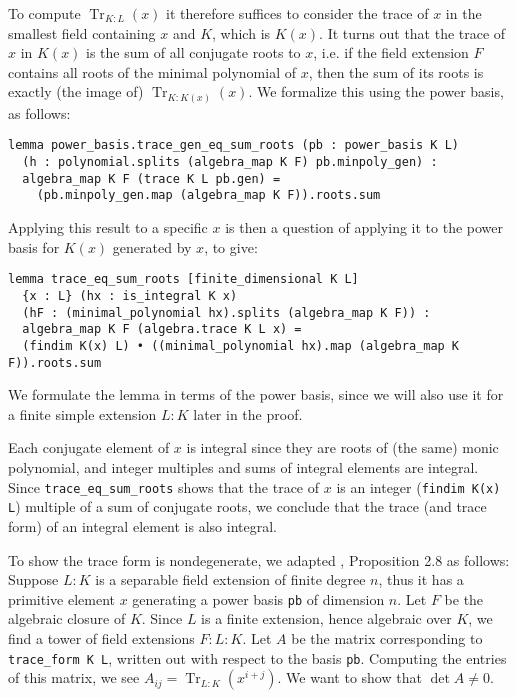 \documentclass{lipics-v2021}
\newcommand{\lean}[1]{\texttt{#1}\xspace} %
\DeclareMathOperator{\Tr}{\mathrm{Tr}}
\begin{document}
To compute $\Tr_{K : L}(x)$ it therefore suffices to consider the trace of $x$ in the smallest field containing $x$ and $K$, which is $K(x)$.
It turns out that the trace of $x$ in $K(x)$ is the sum of all conjugate roots to $x$,
i.e. if the field extension $F$ contains all roots of the minimal polynomial of $x$, then the sum of its roots is exactly (the image of) $\Tr_{K : K(x)}(x)$.
We formalize this using the power basis, as follows:
\begin{lstlisting}
lemma power_basis.trace_gen_eq_sum_roots (pb : power_basis K L)
  (h : polynomial.splits (algebra_map K F) pb.minpoly_gen) :
  algebra_map K F (trace K L pb.gen) =
    (pb.minpoly_gen.map (algebra_map K F)).roots.sum
\end{lstlisting}
Applying this result to a specific $x$ is then a question of applying it to the power basis for $K(x)$ generated by $x$, to give:
\begin{lstlisting}
lemma trace_eq_sum_roots [finite_dimensional K L]
  {x : L} (hx : is_integral K x)
  (hF : (minimal_polynomial hx).splits (algebra_map K F)) :
  algebra_map K F (algebra.trace K L x) =
  (findim K(x) L) • ((minimal_polynomial hx).map (algebra_map K F)).roots.sum
\end{lstlisting}
We formulate the lemma in terms of the power basis, since we will also use it for a finite simple extension $L : K$ later in the proof.

Each conjugate element of $x$ is integral since they are roots of (the same) monic polynomial,
and integer multiples and sums of integral elements are integral.
Since \lean{trace\_eq\_sum\_roots} shows that the trace of $x$ is an integer (\lean{findim K(x) L}) multiple of a sum of conjugate roots,
we conclude that the trace (and trace form) of an integral element is also integral.

To show the trace form is nondegenerate, we adapted \cite{Neukirch}, Proposition 2.8 as follows:
Suppose $L : K$ is a separable field extension of finite degree $n$,
thus it has a primitive element $x$ generating a power basis \lean{pb} of dimension $n$.
Let $F$ be the algebraic closure of $K$. Since $L$ is a finite extension, hence algebraic over $K$, we find a tower of field extensions $F : L : K$.
Let $A$ be the matrix corresponding to \lean{trace\_form K L}, written out with respect to the basis \lean{pb}.
Computing the entries of this matrix, we see $A_{ij} = \Tr_{L : K} (x^{i + j})$.
We want to show that $\det A \ne 0$.
\end{document}
